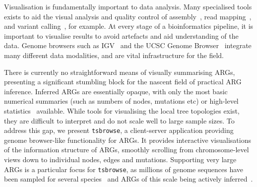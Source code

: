 \documentclass[unnumsec,webpdf,contemporary,large,namedate]{oup-authoring-template}%
\begin{document}
Visualisation is fundamentally important to data analysis.
Many specialised tools exists to aid the visual analysis and 
quality control
of assembly~\citep{wick2015bandage,challis2020blobtoolkit},
read mapping~\citep{robinson2011integrative},
and variant
calling~\citep{robinson2017variant,tollefson2019viva,konig2023divbrowse},
for example.
At every stage of a bioinformatics pipeline, it is important to visualise 
results to avoid artefacts and aid understanding of the data.
Genome browsers such as IGV~\citep{robinson2011integrative} and the 
UCSC Genome Browser~\citep{nassar2023ucsc} integrate many different
data modalities, and are vital infrastructure for the field.


There is currently no straightforward means of visually summarising
ARGs, presenting a significant stumbling block for the nascent 
field of practical ARG inference. Inferred ARGs are essentially opaque,
with only the most basic numerical summaries (such as numbers 
of nodes, mutations etc) or high-level
statistics~\citep{ralph2020efficiently} available. While tools 
for visualising the local tree topologies exist, they are difficult
to interpret and do not scale well to large sample sizes. 
To address this gap, we present \texttt{tsbrowse}, a
client-server application providing genome browser-like 
functionality for ARGs. 
It provides interactive visualisations of the information structure 
of ARGs, smoothly scrolling from chromosome-level views down to 
individual nodes, edges and mutations. Supporting very large ARGs is a 
particular focus for \texttt{tsbrowse}, as millions of genome
sequences have been sampled for several
species~\citep{cesarani2022multibreed,stark2024call,hunt2024addressing}
and ARGs of this scale being actively
inferred~\citep{kelleher2019inferring,zhang2023biobank,
zhan2023towards,gunnarsson2024scalable}.
\end{document}
